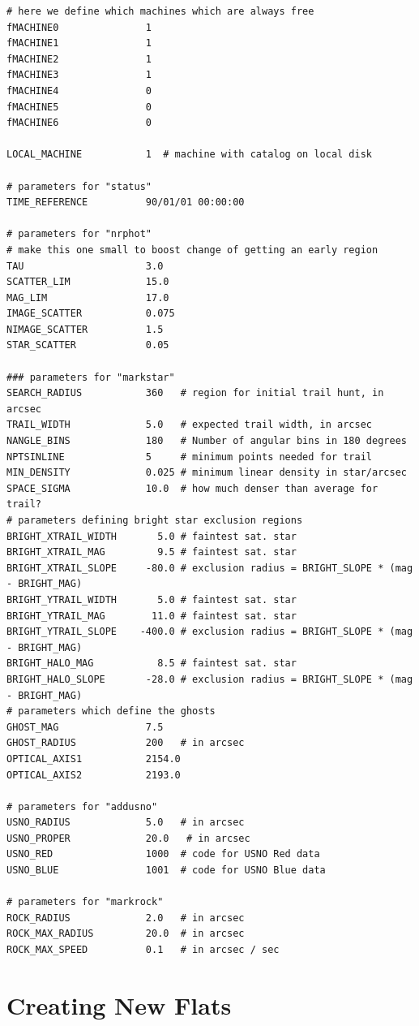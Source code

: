\documentclass{article}
\begin{document}
\begin{verbatim}
# here we define which machines which are always free
fMACHINE0               1
fMACHINE1               1
fMACHINE2               1
fMACHINE3               1
fMACHINE4               0
fMACHINE5               0
fMACHINE6               0

LOCAL_MACHINE           1  # machine with catalog on local disk

# parameters for "status"
TIME_REFERENCE          90/01/01 00:00:00

# parameters for "nrphot"
# make this one small to boost change of getting an early region 
TAU                     3.0             
SCATTER_LIM             15.0
MAG_LIM                 17.0
IMAGE_SCATTER           0.075
NIMAGE_SCATTER          1.5
STAR_SCATTER            0.05

### parameters for "markstar"
SEARCH_RADIUS           360   # region for initial trail hunt, in arcsec 
TRAIL_WIDTH             5.0   # expected trail width, in arcsec
NANGLE_BINS             180   # Number of angular bins in 180 degrees
NPTSINLINE              5     # minimum points needed for trail
MIN_DENSITY             0.025 # minimum linear density in star/arcsec
SPACE_SIGMA             10.0  # how much denser than average for trail?
# parameters defining bright star exclusion regions
BRIGHT_XTRAIL_WIDTH       5.0 # faintest sat. star
BRIGHT_XTRAIL_MAG         9.5 # faintest sat. star
BRIGHT_XTRAIL_SLOPE     -80.0 # exclusion radius = BRIGHT_SLOPE * (mag - BRIGHT_MAG)
BRIGHT_YTRAIL_WIDTH       5.0 # faintest sat. star
BRIGHT_YTRAIL_MAG        11.0 # faintest sat. star
BRIGHT_YTRAIL_SLOPE    -400.0 # exclusion radius = BRIGHT_SLOPE * (mag - BRIGHT_MAG)
BRIGHT_HALO_MAG           8.5 # faintest sat. star
BRIGHT_HALO_SLOPE       -28.0 # exclusion radius = BRIGHT_SLOPE * (mag - BRIGHT_MAG)
# parameters which define the ghosts
GHOST_MAG               7.5
GHOST_RADIUS            200   # in arcsec
OPTICAL_AXIS1           2154.0
OPTICAL_AXIS2           2193.0

# parameters for "addusno"
USNO_RADIUS             5.0   # in arcsec
USNO_PROPER             20.0   # in arcsec
USNO_RED                1000  # code for USNO Red data
USNO_BLUE               1001  # code for USNO Blue data

# parameters for "markrock"
ROCK_RADIUS             2.0   # in arcsec
ROCK_MAX_RADIUS         20.0  # in arcsec
ROCK_MAX_SPEED          0.1   # in arcsec / sec
\end{verbatim}

\section{Creating New Flats}
\end{document}
